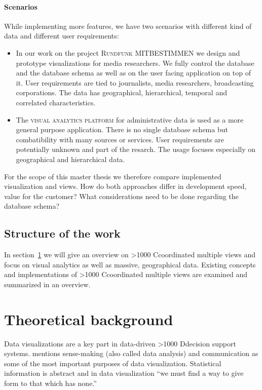\documentclass{article}
\newcommand{\rufu}{\textsc{Rundfunk MITBESTIMMEN}}
\newcommand{\visan}{\textsc{visual analytics platform}}
\newcommand\hmm[1]{\ifnum\ifhmode\spacefactor\else2000\fi>1000 \uppercase{#1}\else#1\fi}
\newcommand{\cmvs}{\hmm{c}oordinated multiple views}
\newcommand{\dss}{\hmm{d}ecision support systems}
\begin{document}
\paragraph{Scenarios}
While implementing more features, we have two scenarios with different kind of data and different user requirements:
\begin{itemize}
  \item
    In our work on the project \rufu{} we design and prototype visualizations for media researchers.
    We fully control the database and the database schema as well as on the user facing application on top of it.
    User requirements are tied to journalists, media researchers, broadcasting corporations.
    The data has geographical, hierarchical, temporal and correlated characteristics.
  \item
    The \visan{} for administrative data is used as a more general purpose application.
    There is no single database schema but combatibility with many sources or services.
    User requirements are potentially unknown and part of the resarch.
    The usage focuses especially on geographical and hierarchical data.
\end{itemize}

For the scope of this master thesis we therefore compare implemented visualization and views.
How do both approaches differ in development speed, value for the customer?
What considerations need to be done regarding the database schema?

\subsection{Structure of the work}

In section~\ref{sec:related-work} we will give an overview on \cmvs{} and focus on visual analytics as well as massive, geographical data.
Existing concepts and implementations of \cmvs{} are examined and summarized in an overview.

\clearpage
\section{Theoretical background}\label{sec:related-work}
Data visualizations are a key part in data-driven \dss{}\cite{Nada2007}\cite{Poleto2015}.
\textcite{Few2013} mentions sense-making (also called data analysis) and communication as some of the most important purposes of data visualization.
Statistical information is abstract and in data visualization ``we must find a way to give form to that which has none.''\cite{Few2013}
\end{document}
